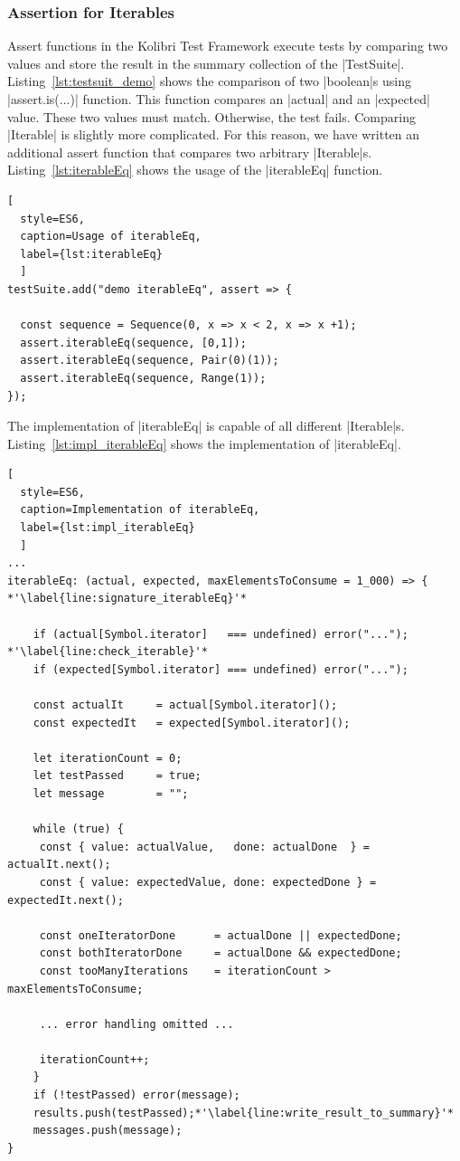 \subsubsection{Assertion for Iterables}
Assert functions in the Kolibri Test Framework execute tests by comparing
two values and store the result in the summary collection of the |TestSuite|.
Listing~\ref{lst:testsuit_demo} shows the comparison of two |boolean|s using
|assert.is(...)| function.
This function compares an |actual| and an |expected| value. These two values
must match. Otherwise, the test fails.
\newline
Comparing |Iterable| is slightly more complicated. For this reason, we have 
written an additional assert function that compares two arbitrary |Iterable|s.
Listing~\ref{lst:iterableEq} shows the usage of the |iterableEq| function.

\begin{lstlisting}[
  style=ES6, 
  caption=Usage of iterableEq,
  label={lst:iterableEq}
  ]
testSuite.add("demo iterableEq", assert => {

  const sequence = Sequence(0, x => x < 2, x => x +1);
  assert.iterableEq(sequence, [0,1]);
  assert.iterableEq(sequence, Pair(0)(1));
  assert.iterableEq(sequence, Range(1));
});  
\end{lstlisting}

The implementation of |iterableEq| is capable of all different 
|Iterable|s. Listing~\ref{lst:impl_iterableEq} shows the
implementation of |iterableEq|. 

\begin{lstlisting}[
  style=ES6, 
  caption=Implementation of iterableEq,
  label={lst:impl_iterableEq}
  ]
...
iterableEq: (actual, expected, maxElementsToConsume = 1_000) => { *'\label{line:signature_iterableEq}'*

    if (actual[Symbol.iterator]   === undefined) error("..."); *'\label{line:check_iterable}'*
    if (expected[Symbol.iterator] === undefined) error("...");

    const actualIt     = actual[Symbol.iterator]();
    const expectedIt   = expected[Symbol.iterator]();

    let iterationCount = 0;
    let testPassed     = true;
    let message        = "";

    while (true) {
     const { value: actualValue,   done: actualDone  } = actualIt.next();
     const { value: expectedValue, done: expectedDone } = expectedIt.next();

     const oneIteratorDone      = actualDone || expectedDone;
     const bothIteratorDone     = actualDone && expectedDone;
     const tooManyIterations    = iterationCount > maxElementsToConsume;

     ... error handling omitted ...

     iterationCount++;
    }
    if (!testPassed) error(message);
    results.push(testPassed);*'\label{line:write_result_to_summary}'*
    messages.push(message);
}
\end{lstlisting}

